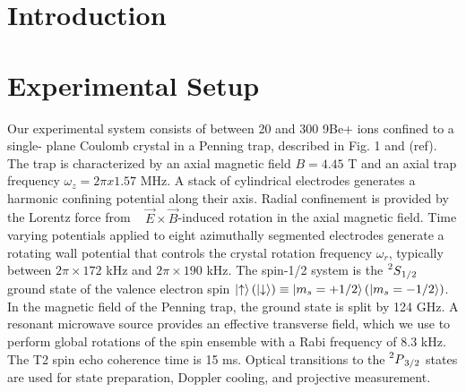 \documentclass[aps,prl,preprint,groupedaddress]{revtex4-1}
\begin{document}
\section{Introduction}
\section{Experimental Setup}

Our experimental system consists of between 20 and 300 9Be+ ions confined to a single-
plane Coulomb crystal in a Penning trap, described in Fig. 1 and (ref). The trap is characterized by an axial magnetic field $B = 4.45$ T and an axial trap frequency $\omega_z = 2\pi x 1.57$ MHz. A stack of cylindrical electrodes generates a harmonic confining potential along their axis. Radial confinement is provided by the Lorentz force from ~
$\vec{E} \times \vec{B}$-induced rotation in the axial magnetic field. Time varying potentials applied to eight azimuthally segmented electrodes generate a rotating wall potential that controls the crystal rotation frequency $\omega_r$, typically between $2\pi \times 172$ kHz and $2\pi \times 190$ kHz. The spin-1/2 system is the $\prescript{2}{}{S}_{1/2}$ ground state of the valence electron spin $\ket{\uparrow} (\ket{\downarrow}) \equiv \ket{m_{s}=+1/2} (\ket{m_{s}=-1/2}) $. In the magnetic field of the Penning trap, the ground state is split by 124 GHz. A resonant microwave source provides an effective transverse field, which
we use to perform global rotations of the spin ensemble with a Rabi frequency of 8.3 kHz. The T2 spin echo coherence time is 15 ms. Optical transitions to the $\prescript{2}{}{P}_{3/2}$ states are used for state preparation, Doppler cooling, and projective measurement. 
\end{document}
